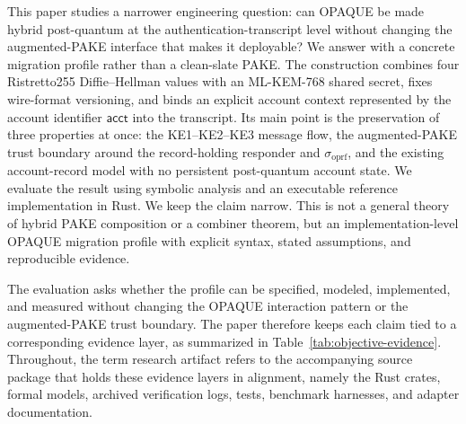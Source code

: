 \documentclass[preprint,12pt]{elsarticle}
\newcommand{\acct}{\mathsf{acct}}
\newcommand{\sigoprf}{\sigma_{\mathrm{oprf}}}
\theoremstyle{remark}
\begin{document}
This paper studies a narrower engineering question: can OPAQUE be made hybrid
post-quantum at the authentication-transcript level without changing the
augmented-PAKE interface that makes it deployable? We answer with a concrete
migration profile rather than a clean-slate PAKE. The construction combines four
Ristretto255 Diffie--Hellman values with an ML-KEM-768 shared secret, fixes
wire-format versioning, and binds an explicit account context represented by the
account identifier $\acct$ into the transcript. Its main point is the
preservation of three properties at once: the KE1--KE2--KE3 message flow, the
augmented-PAKE trust boundary around the record-holding responder and
$\sigoprf$, and the existing account-record model with no persistent
post-quantum account state. We evaluate the result using symbolic analysis and
an executable reference implementation in Rust. We keep the claim narrow.
This is not a general theory of hybrid PAKE composition or a combiner
theorem, but an implementation-level OPAQUE migration profile with explicit
syntax, stated assumptions, and reproducible evidence.

The evaluation asks whether the profile can be specified, modeled, implemented,
and measured without changing the OPAQUE interaction pattern or the augmented-PAKE
trust boundary. The paper therefore keeps each claim tied to a corresponding
evidence layer, as summarized in Table~\ref{tab:objective-evidence}. Throughout,
the term research artifact refers to the accompanying source package that holds
these evidence layers in alignment, namely the Rust crates, formal models,
archived verification logs, tests, benchmark harnesses, and adapter
documentation.
\end{document}
